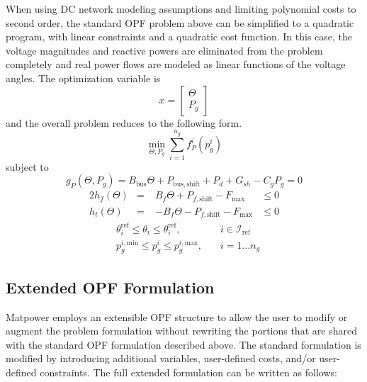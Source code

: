 \documentclass[12pt]{article}
\newcommand{\matpower}[0]{{\sc Matpower}}
\numberwithin{equation}{section}
\numberwithin{table}{section}
\numberwithin{figure}{section}
\begin{document}
When using DC network modeling assumptions and limiting polynomial costs to second order, the standard OPF problem above can be simplified to a quadratic program, with linear constraints and a quadratic cost function. In this case, the voltage magnitudes and reactive powers are eliminated from the problem completely and real power flows are modeled as linear functions of the voltage angles. The optimization variable is
\begin{equation}
x = \left[\begin{array}{c}\Theta \\ P_g \end{array}\right]
\end{equation}
and the overall problem reduces to the following form.
\begin{equation}
\min_{\Theta, P_g} \sum_{i=1}^{n_g} f_P^i(p_g^i)
\end{equation}
subject to
\begin{equation}
g_P(\Theta, P_g) = B_\mathrm{bus} \Theta + P_\mathrm{bus,shift} + P_d + G_{sh} - C_g P_g = 0 \label{eq:dcopf_eq}
\end{equation}
\begin{alignat}{2}
h_f(\Theta) &=\;& B_f \Theta + P_{f,\mathrm{shift}} -  F_\mathrm{max} &\le 0  \label{eq:dcopf_ieqf} \\
h_t(\Theta) &=  & -B_f \Theta - P_{f,\mathrm{shift}} -  F_\mathrm{max} &\le 0  \label{eq:dcopf_ieqt}
\end{alignat}
\begin{eqnarray}
& \theta_i^\mathrm{ref} \le \theta_i \le \theta_i^\mathrm{ref}, \quad & i \in  \mathcal{I}_\mathrm{ref} \\
& p_g^{i,\mathrm{min}} \le p_g^i \le p_g^{i, \mathrm{max}}, \quad & i=1 \ldots n_g
\end{eqnarray}

\subsection{Extended OPF Formulation}
\label{sec:extended_opf}

\matpower{} employs an extensible OPF structure to allow the user to modify or augment the problem formulation without rewriting the portions that are shared with the standard OPF formulation described above. The standard formulation is modified by introducing additional variables, user-defined costs, and/or user-defined constraints. The full extended formulation can be written as follows:
\end{document}
